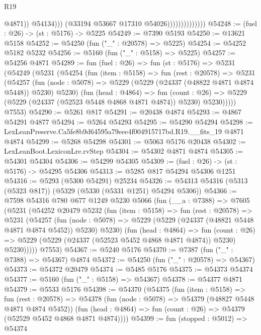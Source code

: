 \begin{lexlean}{R19}
\begin{coremodule}
                                        @4871))
                                    @54134)))
                              (@33194 @53667 @17310 @54026))))))))))))))
@54248 := (fuel : @26) -> (st : @5176) -> @5225
@54249 := @7390 @5193
@54250 := @13621 @5158
@54252 := @54250 (fun ("_" : @20578) => @5225)
@54254 := @54252 @5182 @5232
@54256 := @5160 (fun ("_" : @5158) => @5225)
@54257 := @54256 @4871
@54289 := fun (fuel : @26) =>
  fun (st : @5176) =>
  @5231
    (@54249
      (@5231
        (@54254
          (fun (item : @5158) =>
          fun (rest : @20578) =>
          @5231
            (@54257
              (fun (node : @5078) => @5229 (@5229 (@24337 (@48822 @4871 @4874 @5448)) @5230) @5230)
              (fun (head : @4864) =>
              fun (count : @26) =>
              @5229 (@5229 (@24337 (@52523 @5448 @4868 @4871 @4874)) @5230) @5230)))))
      @7553)
@54290 := @5261 @817
@54291 := @20438 @4874
@54293 := @4867 @54291 @4877
@54294 := @5264 @54293
@54295 := @54290 @54294
@54298 := LexLeanPreserve.Ca5fe8b9d64595a79eee4f004915717bd.R19.__fits_19 @4871 @4874
@54299 := @5268 @54298
@54301 := @5063 @5176 @20438
@54302 := LexLeanBoot.LexiconLre.rvStep
@54304 := @54302 @4871 @4874
@54305 := @54301 @54304
@54306 := @54299 @54305
@54309 := (fuel : @26) -> (st : @5176) -> @54295 @54306
@54313 := @5285 @817 @54294 @54306 @1251
@54316 := @5293 (@5300 @54291) @25234
@54326 := @54313 @54316 (@5313 (@5323 @817)) (@5329 (@5330 (@5331 @1251) @54294 @5306))
@54366 := @7598
    @54316
    @780
    @677
    @1249
    @5230
    @5066
    (fun (__a : @7388) =>
    @7605
      (@5231
        (@54252
          @20479
          @5232
          (fun (item : @5158) =>
          fun (rest : @20578) =>
          @5231
            (@54257
              (fun (node : @5078) =>
              @5229 (@5229 (@24337 (@48821 @5448 @4871 @4874 @5452)) @5230) @5230)
              (fun (head : @4864) =>
              fun (count : @26) =>
              @5229 (@5229 (@24337 (@52523 @5452 @4868 @4871 @4874)) @5230) @5230)))))
      @7553)
@54367 := @5240 @5176
@54370 := @7387 (fun ("_" : @7388) => @54367) @4874
@54372 := @54250 (fun ("_" : @20578) => @54367)
@54373 := @54372 @20479
@54374 := @5485 @5176
@54375 := @54373 @54374
@54377 := @5160 (fun ("_" : @5158) => @54367)
@54378 := @54377 @4871
@54379 := @5533 @5176
@54398 := @54370
    (@54375
      (fun (item : @5158) =>
      fun (rest : @20578) =>
      @54378
        (fun (node : @5078) => @54379 (@48827 @5448 @4871 @4874 @5452))
        (fun (head : @4864) => fun (count : @26) => @54379 (@52529 @5452 @4868 @4871 @4874))))
@54399 := fun (stopped : @5012) => @54374

\end{coremodule}
\end{lexlean}
